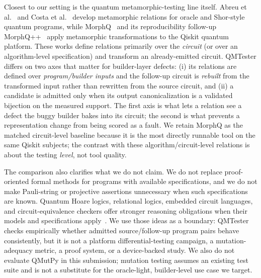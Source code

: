 

Closest to our setting is the quantum metamorphic-testing line itself. Abreu et al.~\cite{abreu2022metamorphic} and Costa et al.~\cite{costa2022asserting} develop metamorphic relations for oracle and Shor-style quantum programs, while MorphQ~\cite{paltenghi2023morphq} and its reproducibility follow-up MorphQ++~\cite{kitt2024morphqpp} apply metamorphic transformations to the Qiskit quantum platform. These works define relations primarily over the \emph{circuit} (or over an algorithm-level specification) and transform an already-emitted circuit. QMTester differs on two axes that matter for builder-layer defects: (i) its relations are defined over \emph{program/builder inputs} and the follow-up circuit is \emph{rebuilt} from the transformed input rather than rewritten from the source circuit, and (ii) a candidate is admitted only when its output canonicalization is a validated bijection on the measured support. The first axis is what lets a relation see a defect the buggy builder bakes into its circuit; the second is what prevents a representation change from being scored as a fault. We retain MorphQ as the matched circuit-level baseline because it is the most directly runnable tool on the same Qiskit subjects; the contrast with these algorithm/circuit-level relations is about the testing \emph{level}, not tool quality.

The comparison also clarifies what we do not claim. We do not replace proof-oriented formal methods for programs with available specifications, and we do not make Pauli-string or projective assertions unnecessary when such specifications are known. Quantum Hoare logics, relational logics, embedded circuit languages, and circuit-equivalence checkers offer stronger reasoning obligations when their models and specifications apply~\cite{ying2011hoare,unruh2019qrhl,paykin2017qwire,peham2022zx}. We use those ideas as a boundary: QMTester checks empirically whether admitted source/follow-up program pairs behave consistently, but it is not a platform differential-testing campaign, a mutation-adequacy metric, a proof system, or a device-backed study. We also do not evaluate QMutPy in this submission; mutation testing assumes an existing test suite and is not a substitute for the oracle-light, builder-level use case we target.
